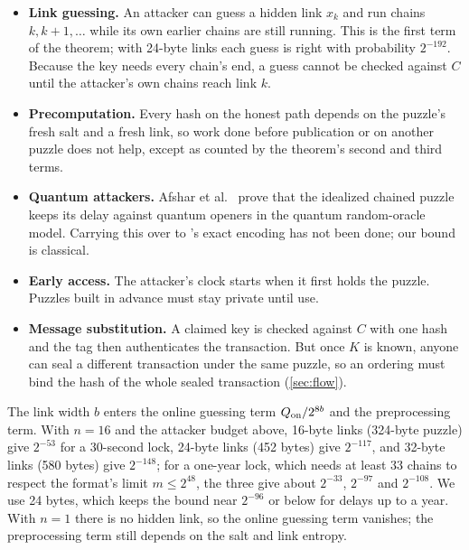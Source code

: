\begin{itemize}[leftmargin=1.5em]
  \item \textbf{Link guessing.} An attacker can guess a hidden link $x_k$ and run chains $k, k+1, \dots$ while its own earlier chains are still running. This is the first term of the theorem; with 24-byte links each guess is right with probability $2^{-192}$. Because the key needs every chain's end, a guess cannot be checked against $C$ until the attacker's own chains reach link $k$.
  \item \textbf{Precomputation.} Every hash on the honest path depends on the puzzle's fresh salt and a fresh link, so work done before publication or on another puzzle does not help, except as counted by the theorem's second and third terms.
  \item \textbf{Quantum attackers.} Afshar et al.~\cite{ACHLM23} prove that the idealized chained puzzle keeps its delay against quantum openers in the quantum random-oracle model. Carrying this over to \leanseal's exact encoding has not been done; our bound is classical.
  \item \textbf{Early access.} The attacker's clock starts when it first holds the puzzle. Puzzles built in advance must stay private until use.
  \item \textbf{Message substitution.} A claimed key is checked against $C$ with one hash and the tag then authenticates the transaction. But once $K$ is known, anyone can seal a different transaction under the same puzzle, so an ordering must bind the hash of the whole sealed transaction (\cref{sec:flow}).
\end{itemize}

The link width $b$ enters the online guessing term $Q_{\mathrm{on}} / 2^{8b}$ and the preprocessing term. With $n = 16$ and the attacker budget above, 16-byte links (324-byte puzzle) give $2^{-53}$ for a 30-second lock, 24-byte links (452 bytes) give $2^{-117}$, and 32-byte links (580 bytes) give $2^{-148}$; for a one-year lock, which needs at least 33 chains to respect the format's limit $m \le 2^{48}$, the three give about $2^{-33}$, $2^{-97}$ and $2^{-108}$. We use 24 bytes, which keeps the bound near $2^{-96}$ or below for delays up to a year. With $n = 1$ there is no hidden link, so the online guessing term vanishes; the preprocessing term still depends on the salt and link entropy.

